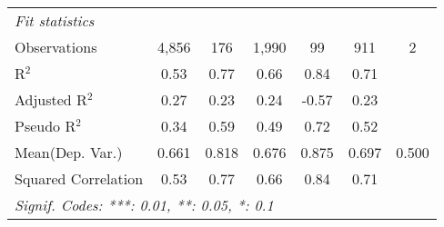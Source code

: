 \begin{tabular}{lcccccc}
   \midrule
   \emph{Fit statistics}\\
   Observations                                               & 4,856          & 176     & 1,990          & 99      & 911            & 2\\  
   R$^2$                                                      & 0.53           & 0.77    & 0.66           & 0.84    & 0.71           & \\  
   Adjusted R$^2$                                             & 0.27           & 0.23    & 0.24           & -0.57   & 0.23           & \\  
   Pseudo R$^2$                                               & 0.34           & 0.59    & 0.49           & 0.72    & 0.52           & \\  
Mean(Dep. Var.) & 0.661 & 0.818 & 0.676 & 0.875 & 0.697 & 0.500 \\
   Squared Correlation                                        & 0.53           & 0.77    & 0.66           & 0.84    & 0.71           & \\  
   \midrule \midrule
   \multicolumn{7}{l}{\emph{Signif. Codes: ***: 0.01, **: 0.05, *: 0.1}}\\
\end{tabular}
\par\endgroup
